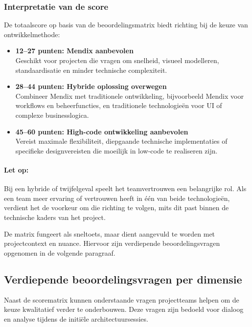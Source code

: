 \subsubsection{Interpretatie van de score}
De totaalscore op basis van de beoordelingsmatrix biedt richting bij de keuze van ontwikkelmethode:

\begin{itemize}
    \item \textbf{12–27 punten: Mendix aanbevolen} \\
    Geschikt voor projecten die vragen om snelheid, visueel modelleren, standaardisatie en minder technische complexiteit.
    
    \item \textbf{28–44 punten: Hybride oplossing overwegen} \\
    Combineer Mendix met traditionele ontwikkeling, bijvoorbeeld Mendix voor workflows en beheerfuncties, en traditionele technologieën voor UI of complexe businesslogica.
    
    \item \textbf{45–60 punten: High-code ontwikkeling aanbevolen} \\
    Vereist maximale flexibiliteit, diepgaande technische implementaties of specifieke designvereisten die moeilijk in low-code te realiseren zijn.
\end{itemize}

\paragraph{Let op:} Bij een hybride of twijfelgeval speelt het teamvertrouwen een belangrijke rol. Als een team meer ervaring of vertrouwen heeft in één van beide technologieën, verdient het de voorkeur om die richting te volgen, mits dit past binnen de technische kaders van het project.

De matrix fungeert als sneltoets, maar dient aangevuld te worden met projectcontext en nuance. Hiervoor zijn verdiepende beoordelingsvragen opgenomen in de volgende paragraaf.

\subsection{Verdiepende beoordelingsvragen per dimensie}
Naast de scorematrix kunnen onderstaande vragen projectteams helpen om de keuze kwalitatief verder te onderbouwen. Deze vragen zijn bedoeld voor dialoog en analyse tijdens de initiële architectuursessies.

